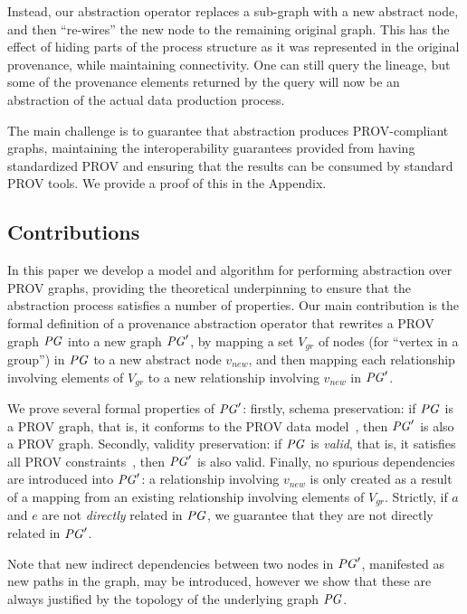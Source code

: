Instead, our abstraction operator replaces a sub-graph with a new abstract node, and then ``re-wires'' the new node to the remaining original graph. This has the effect of hiding parts of the process structure as it was represented in the original provenance, while maintaining connectivity. One can still query the lineage, but some of the provenance elements returned by the query will now be an abstraction of the actual data production process.

The main challenge is to guarantee that abstraction produces PROV-compliant  graphs,   maintaining the interoperability guarantees provided from having standardized PROV and ensuring that the results can be consumed by standard PROV tools. We provide a proof of this in the Appendix.

\subsection{Contributions} \label{sec:contributions}

In this paper we develop a model and algorithm for performing  abstraction over PROV graphs, providing the theoretical underpinning to ensure that the abstraction process satisfies a number of properties.
%
Our main contribution is the formal definition of a provenance abstraction operator that rewrites  a PROV graph $\mathit{PG}$ into a new graph $\mathit{PG}'$, by mapping a set $V_{gr}$ of nodes (for ``vertex in a group'') in $\mathit{PG}$ to a new abstract node $v_{new}$, and then mapping each relationship involving elements of $V_{gr}$ to a new relationship involving $v_{new}$ in $\mathit{PG}'$. 

We prove several formal properties of $\mathit{PG}'$: firstly, schema preservation: if $\mathit{PG}$ is a PROV graph, that is, it conforms to the PROV data model~\citep{w3c-prov-dm}, then $\mathit{PG}'$ is also a PROV graph. Secondly, validity preservation: if $\mathit{PG}$ is \textit{valid}, that is, it satisfies all PROV constraints~\citep{w3c-prov-dm}, then $\mathit{PG}'$ is also valid. Finally, no spurious dependencies are introduced into $\mathit{PG}'$: a  relationship involving $v_{new}$ is only created as a result of a mapping from an existing relationship involving elements of $V_{gr}$. Strictly, if $a$ and $e$ are not \textit{directly} related in $\mathit{PG}$, we guarantee that they are not directly related in $\mathit{PG}'$. 

Note that new indirect dependencies between two nodes in $\mathit{PG}'$, manifested as new paths in the graph, may be introduced, however we show that these are always justified by the topology of the underlying graph $\mathit{PG}$.


